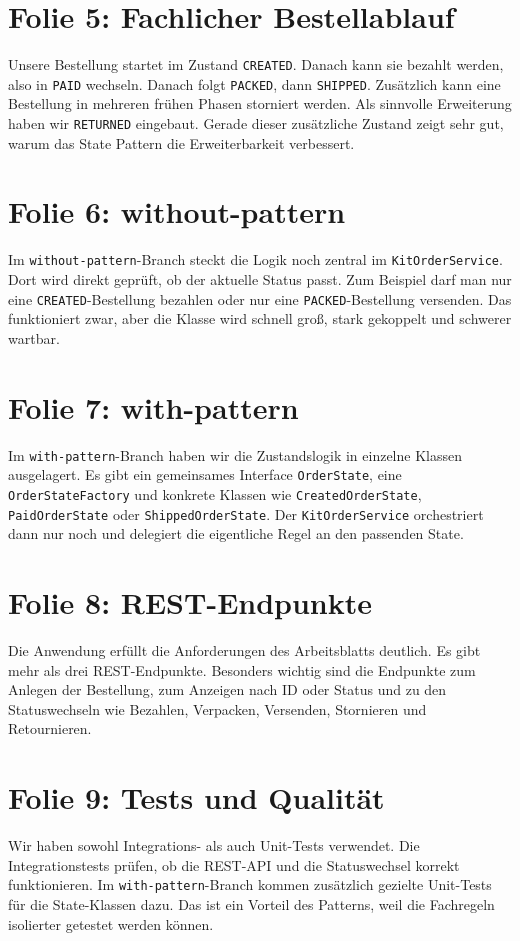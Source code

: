 \documentclass[a4paper,11pt]{article}
\begin{document}
\section*{Folie 5: Fachlicher Bestellablauf}
Unsere Bestellung startet im Zustand \texttt{CREATED}. Danach kann sie bezahlt werden, also in \texttt{PAID} wechseln. Danach folgt \texttt{PACKED}, dann \texttt{SHIPPED}. Zusätzlich kann eine Bestellung in mehreren frühen Phasen storniert werden. Als sinnvolle Erweiterung haben wir \texttt{RETURNED} eingebaut. Gerade dieser zusätzliche Zustand zeigt sehr gut, warum das State Pattern die Erweiterbarkeit verbessert.

\section*{Folie 6: without-pattern}
Im \texttt{without-pattern}-Branch steckt die Logik noch zentral im \texttt{KitOrderService}. Dort wird direkt geprüft, ob der aktuelle Status passt. Zum Beispiel darf man nur eine \texttt{CREATED}-Bestellung bezahlen oder nur eine \texttt{PACKED}-Bestellung versenden. Das funktioniert zwar, aber die Klasse wird schnell groß, stark gekoppelt und schwerer wartbar.

\section*{Folie 7: with-pattern}
Im \texttt{with-pattern}-Branch haben wir die Zustandslogik in einzelne Klassen ausgelagert. Es gibt ein gemeinsames Interface \texttt{OrderState}, eine \texttt{OrderStateFactory} und konkrete Klassen wie \texttt{CreatedOrderState}, \texttt{PaidOrderState} oder \texttt{ShippedOrderState}. Der \texttt{KitOrderService} orchestriert dann nur noch und delegiert die eigentliche Regel an den passenden State.

\section*{Folie 8: REST-Endpunkte}
Die Anwendung erfüllt die Anforderungen des Arbeitsblatts deutlich. Es gibt mehr als drei REST-Endpunkte. Besonders wichtig sind die Endpunkte zum Anlegen der Bestellung, zum Anzeigen nach ID oder Status und zu den Statuswechseln wie Bezahlen, Verpacken, Versenden, Stornieren und Retournieren.

\section*{Folie 9: Tests und Qualität}
Wir haben sowohl Integrations- als auch Unit-Tests verwendet. Die Integrationstests prüfen, ob die REST-API und die Statuswechsel korrekt funktionieren. Im \texttt{with-pattern}-Branch kommen zusätzlich gezielte Unit-Tests für die State-Klassen dazu. Das ist ein Vorteil des Patterns, weil die Fachregeln isolierter getestet werden können.
\end{document}

